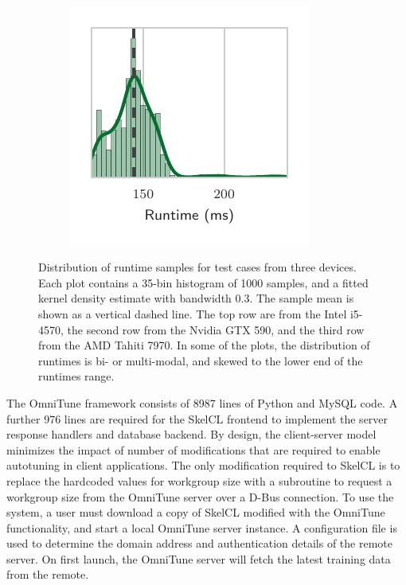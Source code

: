 \documentclass[nonatbib,preprint,nocopyrightspace,9pt]{sigplanconf}
\begin{document}
\begin{figure}
\begin{subfigure}[h]{.32\columnwidth}
\vspace{-1.5em} %
\caption{}
\label{fig:runtimes-histogram-8}
\end{subfigure}
~%
\begin{subfigure}[h]{.32\columnwidth}
\centering
\includegraphics[width=\textwidth]{img/runtimes_histogram_9}
\vspace{-1.5em} %
\caption{}
\label{fig:runtimes-histogram-9}
\end{subfigure}
\caption[Distribution of stencil code runtimes]{%
  Distribution of runtime samples for test cases from three devices. Each plot
  contains a 35-bin histogram of 1000 samples, and a fitted kernel density
  estimate with bandwidth 0.3. The sample mean is shown as a vertical dashed
  line. The top row are from the Intel i5-4570, the second row from the Nvidia
  GTX 590, and the third row from the AMD Tahiti 7970. In some of the plots, the
  distribution of runtimes is bi- or multi-modal, and skewed to the lower end of
  the runtimes range.%
}
\label{fig:runtime-histograms}
\end{figure}

The OmniTune framework consists of 8987 lines of Python and MySQL code. A
further 976 lines are required for the SkelCL frontend to implement the server
response handlers and database backend. By design, the client-server model
minimizes the impact of number of modifications that are required to enable
autotuning in client applications. The only modification required to SkelCL is
to replace the hardcoded values for workgroup size with a subroutine to request
a workgroup size from the OmniTune server over a D-Bus connection. To use the
system, a user must download a copy of SkelCL modified with the OmniTune
functionality, and start a local OmniTune server instance. A configuration file
is used to determine the domain address and authentication details of the remote
server. On first launch, the OmniTune server will fetch the latest training data
from the remote.
\end{document}

